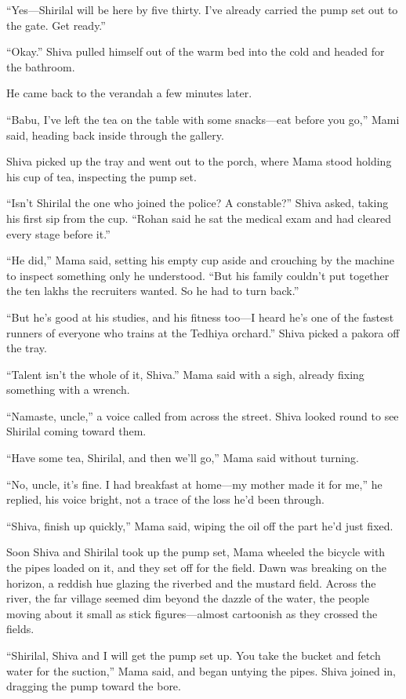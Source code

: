 ``Yes—Shirilal will be here by five thirty. I've already carried the pump set out to the gate. Get ready.''

``Okay.'' Shiva pulled himself out of the warm bed into the cold and headed for the bathroom.

He came back to the verandah a few minutes later.

``Babu, I've left the tea on the table with some snacks—eat before you go,'' Mami said, heading back inside through the gallery.

Shiva picked up the tray and went out to the porch, where Mama stood holding his cup of tea, inspecting the pump set.

``Isn't Shirilal the one who joined the police? A constable?'' Shiva asked, taking his first sip from the cup. ``Rohan said he sat the medical exam and had cleared every stage before it.''

``He did,'' Mama said, setting his empty cup aside and crouching by the machine to inspect something only he understood. ``But his family couldn't put together the ten lakhs the recruiters wanted. So he had to turn back.''

``But he's good at his studies, and his fitness too—I heard he's one of the fastest runners of everyone who trains at the Tedhiya orchard.'' Shiva picked a pakora off the tray.

``Talent isn't the whole of it, Shiva.'' Mama said with a sigh, already fixing something with a wrench.

``Namaste, uncle,'' a voice called from across the street. Shiva looked round to see Shirilal coming toward them.

``Have some tea, Shirilal, and then we'll go,'' Mama said without turning.

``No, uncle, it's fine. I had breakfast at home—my mother made it for me,'' he replied, his voice bright, not a trace of the loss he'd been through.

``Shiva, finish up quickly,'' Mama said, wiping the oil off the part he'd just fixed.

Soon Shiva and Shirilal took up the pump set, Mama wheeled the bicycle with the pipes loaded on it, and they set off for the field. Dawn was breaking on the horizon, a reddish hue glazing the riverbed and the mustard field. Across the river, the far village seemed dim beyond the dazzle of the water, the people moving about it small as stick figures—almost cartoonish as they crossed the fields.

``Shirilal, Shiva and I will get the pump set up. You take the bucket and fetch water for the suction,'' Mama said, and began untying the pipes. Shiva joined in, dragging the pump toward the bore.

